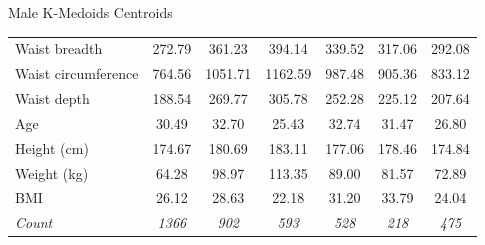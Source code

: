 \documentclass[10pt]{beamer}
\begin{document}
\begin{frame}{Male K-Medoids Centroids}
\begin{tabular}{lcccccc}
		Waist breadth                & 272.79                               & 361.23       & 394.14       & 339.52       & 317.06        & 292.08       \\
		Waist circumference          & 764.56                               & 1051.71      & 1162.59      & 987.48       & 905.36        & 833.12       \\
		Waist depth                  & 188.54                               & 269.77       & 305.78       & 252.28       & 225.12        & 207.64       \\
		\hline
		Age                          & 30.49                                & 32.70        & 25.43        & 32.74        & 31.47         & 26.80        \\
		Height (cm)                  & 174.67                               & 180.69       & 183.11       & 177.06       & 178.46        & 174.84       \\
		Weight (kg)                  & 64.28                                & 98.97        & 113.35       & 89.00        & 81.57         & 72.89        \\
		BMI                          & 26.12                                & 28.63        & 22.18        & 31.20        & 33.79         & 24.04        \\
		\hline
		\textit{Count}               & \textit{1366}                         & \textit{902} & \textit{593} & \textit{528} & \textit{218} & \textit{475}
	\end{tabular}
\end{frame}
\end{document}
